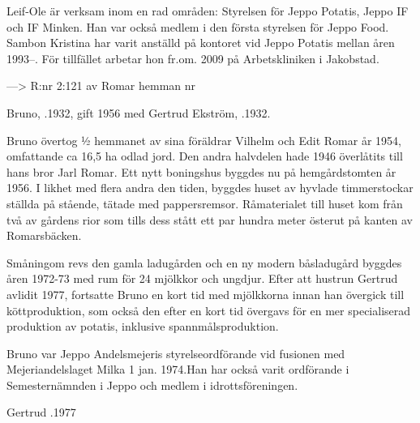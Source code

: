 Leif-Ole är verksam inom en rad områden: Styrelsen för Jeppo Potatis, Jeppo IF och IF Minken. Han var också medlem i den första styrelsen för Jeppo Food. Sambon Kristina har varit anställd på kontoret vid Jeppo Potatis mellan åren 1993--. För tillfället arbetar hon fr.om. 2009 på Arbetskliniken i Jakobstad.


--->  R:nr 2:121 av Romar hemman nr 



Bruno, .1932, gift 1956 med Gertrud Ekström, .1932.

\begin{jhchildren}
   \item {}
   \item {}
   \item {}
   \item {}
\end{jhchildren}

Bruno övertog ½ hemmanet av sina föräldrar Vilhelm och  Edit Romar år 1954, omfattande ca 16,5 ha odlad jord. Den andra halvdelen hade 1946 överlåtits till hans bror Jarl Romar. Ett nytt boningshus byggdes nu på hemgårdstomten år 1956. I likhet med flera andra den tiden, byggdes huset av hyvlade timmerstockar ställda på stående, tätade med pappersremsor. Råmaterialet till huset kom från två av gårdens rior som tills dess stått ett par hundra meter österut på kanten av Romarsbäcken.

Småningom revs den gamla ladugården och en ny modern båsladugård byggdes åren 1972-73 med rum för 24 mjölkkor och ungdjur. Efter att hustrun Gertrud avlidit 1977, fortsatte Bruno en kort tid med mjölkkorna innan han övergick till köttproduktion, som också den efter en kort tid övergavs för en mer specialiserad produktion av potatis, inklusive spannmålsproduktion.

Bruno var Jeppo Andelsmejeris styrelseordförande vid fusionen med Mejeriandelslaget Milka 1 jan. 1974.Han har också varit ordförande i Semesternämnden i Jeppo och medlem i idrottsföreningen.

Gertrud .1977






